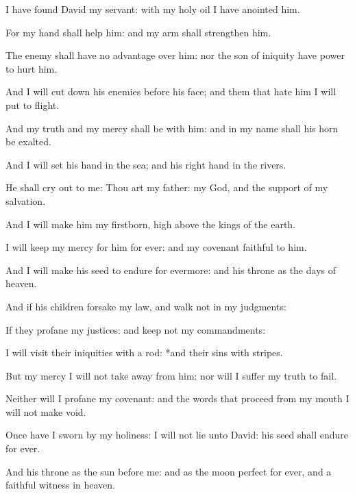 \item I have found David my servant: with my holy oil I have anointed him.
\item For my hand shall help him: and my arm shall strengthen him.
\item The enemy shall have no advantage over him: nor the son of iniquity have power to hurt him.
\item And I will cut down his enemies before his face; and them that hate him I will put to flight.
\item And my truth and my mercy shall be with him: and in my name shall his horn be exalted.
\item And I will set his hand in the sea; and his right hand in the rivers.
\item He shall cry out to me: Thou art my father: my God, and the support of my salvation.
\item And I will make him my firstborn, high above the kings of the earth.
\item I will keep my mercy for him for ever: and my covenant faithful to him.
\item And I will make his seed to endure for evermore: and his throne as the days of heaven.
\item And if his children forsake my law, and walk not in my judgments: 
\item If they profane my justices: and keep not my commandments:
\item I will visit their iniquities with a rod: *and their sins with stripes. 
\item But my mercy I will not take away from him: nor will I suffer my truth to fail.
\item Neither will I profane my covenant: and the words that proceed from my mouth I will not make void.
\item Once have I sworn by my holiness: I will not lie unto David: his seed shall endure for ever.
\item And his throne as the sun before me: and as the moon perfect for ever, and a faithful witness in heaven.